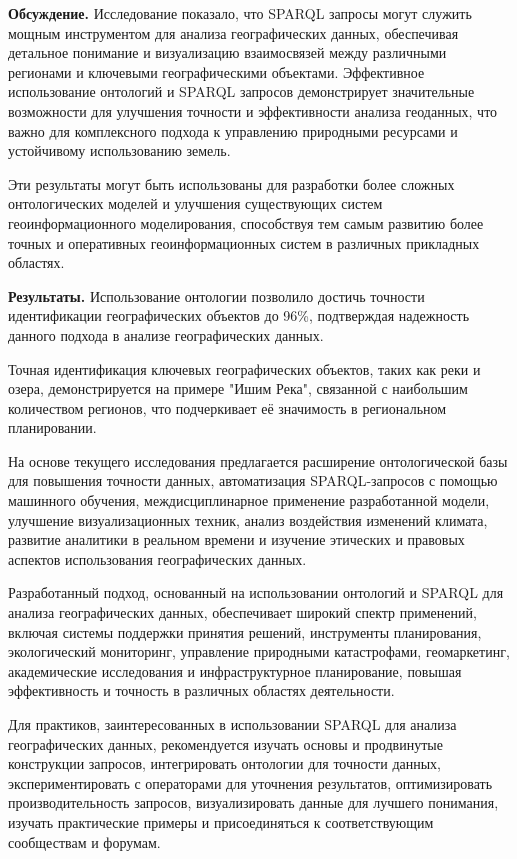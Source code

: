 \textbf{Обсуждение.} Исследование показало, что SPARQL запросы могут
служить мощным инструментом для анализа географических данных,
обеспечивая детальное понимание и визуализацию взаимосвязей между
различными регионами и ключевыми географическими объектами. Эффективное
использование онтологий и SPARQL запросов демонстрирует значительные
возможности для улучшения точности и эффективности анализа геоданных,
что важно для комплексного подхода к управлению природными ресурсами и
устойчивому использованию земель.

Эти результаты могут быть использованы для разработки более сложных
онтологических моделей и улучшения существующих систем
геоинформационного моделирования, способствуя тем самым развитию более
точных и оперативных геоинформационных систем в различных прикладных
областях.

\textbf{Результаты.} Использование онтологии позволило достичь точности
идентификации географических объектов до 96\%, подтверждая надежность
данного подхода в анализе географических данных.

Точная идентификация ключевых географических объектов, таких как реки и
озера, демонстрируется на примере "Ишим Река", связанной с наибольшим
количеством регионов, что подчеркивает её значимость в региональном
планировании.

На основе текущего исследования предлагается расширение онтологической
базы для повышения точности данных, автоматизация SPARQL-запросов с
помощью машинного обучения, междисциплинарное применение разработанной
модели, улучшение визуализационных техник, анализ воздействия изменений
климата, развитие аналитики в реальном времени и изучение этических и
правовых аспектов использования географических данных.

Разработанный подход, основанный на использовании онтологий и SPARQL для
анализа географических данных, обеспечивает широкий спектр применений,
включая системы поддержки принятия решений, инструменты планирования,
экологический мониторинг, управление природными катастрофами,
геомаркетинг, академические исследования и инфраструктурное
планирование, повышая эффективность и точность в различных областях
деятельности.

Для практиков, заинтересованных в использовании SPARQL для анализа
географических данных, рекомендуется изучать основы и продвинутые
конструкции запросов, интегрировать онтологии для точности данных,
экспериментировать с операторами для уточнения результатов,
оптимизировать производительность запросов, визуализировать данные для
лучшего понимания, изучать практические примеры и присоединяться к
соответствующим сообществам и форумам.

